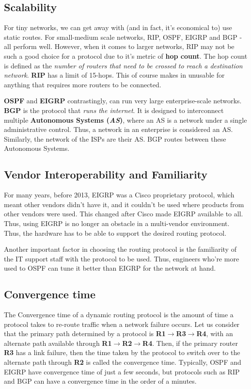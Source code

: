 \subsection{Scalability}
For tiny networks, we can get away with (and in fact, it's economical to) use static routes. For small-medium scale networks, RIP, OSPF, EIGRP and BGP - all perform well. However, when it comes to larger networks, RIP may not be such a good choice for a protocol due to it's metric of \textbf{hop count}. The hop count is defined as the \textit{number of routers that need to be crossed to reach a destination network}. \textbf{RIP} has a limit of 15-hops. This of course makes in unusable for anything that requires more routers to be connected. 

\textbf{OSPF} and \textbf{EIGRP} contrastingly, can run very large enterprise-scale networks. \textbf{BGP} is the protocol that \textit{runs the internet}. It is designed to interconnect multiple \textbf{Autonomous Systems (\textit{AS})}, where an AS is a network under a single administrative control. Thus, a network in an enterprise is considered an AS. Similarly, the network of the ISPs are their AS. BGP routes between these Autonomous Systems. 

\subsection{Vendor Interoperability and Familiarity}
For many years, before 2013, EIGRP was a Cisco proprietary protocol, which meant other vendors didn't have it, and it couldn't be used where products from other vendors were used. This changed after Cisco made EIGRP available to all. Thus, using EIGRP is no longer an obstacle in a multi-vendor environment. Thus, the hardware has to be able to support the desired routing protocol. 

Another important factor in choosing the routing protocol is the familiarity of the IT support staff with the protocol to be used. Thus, engineers who're more used to OSPF can tune it better than EIGRP for the network at hand. 

\subsection{Convergence time}
The Convergence time of a dynamic routing protocol is the amount of time a protocol takes to re-route traffic when a network failure occurs. Let us consider that the primary path determined by a protocol is \textbf{R1$\rightarrow$R3$\rightarrow$R4}, with an alternate path available through \textbf{R1$\rightarrow$R2$\rightarrow$R4}. Then, if the primary router \textbf{R3} has a link failure, then the time taken by the protocol to switch over to the alternate path through \textbf{R2} is called the convergence time. Typically, OSPF and EIGRP have convergence time of just a few seconds, but protocols such as RIP and BGP can have a convergence time in the order of a minutes. 

